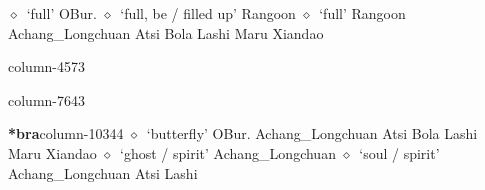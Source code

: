          $\diamond$~`full'
         OBur. 
\hspace{1ex}
         $\diamond$~`full, be / filled up'
         Rangoon 
\hspace{1ex}
         $\diamond$~`full'
         Rangoon 
\hspace{1ex}
         Achang\_Longchuan 
\hspace{1ex}
         Atsi 
\hspace{1ex}
         Bola 
\hspace{1ex}
         Lashi 
\hspace{1ex}
         Maru 
\hspace{1ex}
         Xiandao 
  \item {\footnotesize \textbf{}}{\tiny column-4573}
  \item {\footnotesize \textbf{}}{\tiny column-7643}
  \item {\footnotesize \textbf{*bra}}{\tiny column-10344}
         $\diamond$~`butterfly'
         OBur. 
\hspace{1ex}
         Achang\_Longchuan 
\hspace{1ex}
         Atsi 
\hspace{1ex}
         Bola 
\hspace{1ex}
         Lashi 
\hspace{1ex}
         Maru 
\hspace{1ex}
         Xiandao 
\hspace{1ex}
         $\diamond$~`ghost / spirit'
         Achang\_Longchuan 
\hspace{1ex}
         $\diamond$~`soul / spirit'
         Achang\_Longchuan 
\hspace{1ex}
         Atsi 
\hspace{1ex}
         Lashi 
